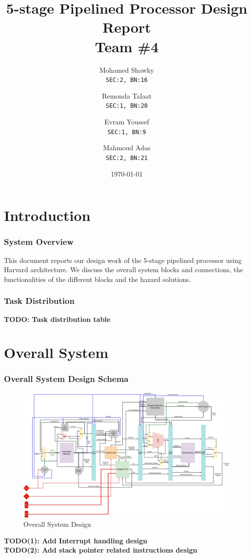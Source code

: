 \documentclass[12pt]{report}
\title{\textbf{5-stage Pipelined Processor Design Report}\\Team \#4}
\author{
  Mohamed Shawky\\
  \small\texttt{SEC:2, BN:16}
  \and
  Remonda Talaat\\
  \small\texttt{SEC:1, BN:20}
  \and
  Evram Youssef\\
  \small\texttt{SEC:1, BN:9}
  \and
  Mahmoud Adas\\
  \small\texttt{SEC:2, BN:21}
}
\date{\today}
\begin{document}
\thispagestyle{empty}

\maketitle
\tableofcontents
\listoffigures
\listoftables
\clearpage


\part{Introduction}

\section{System Overview}
This document reports our design work of the 5-stage pipelined processor using Harvard
architecture. We discuss the overall system blocks and connections, the functionalities of the
different blocks and the hazard solutions. 

\section{Task Distribution}
\textbf{TODO: Task distribution table}

\part{Overall System}

\section{Overall System Design Schema}
\begin{center}
    \begin{figure}[hp]
        \centering
        \includegraphics[width=\textwidth]{overall_system}
        \caption{Overall System Design}
        \label{fig:overall}
    \end{figure}
\end{center}
\textbf{TODO(1): Add Interrupt handling design}\\
\textbf{TODO(2): Add stack pointer related instructions design}\\
\end{document}
